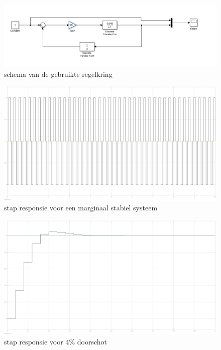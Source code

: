 \documentclass[a4paper, 12pt]{article}
\begin{document}
\begin{figure}[H]
	\includegraphics[width=1\linewidth]{Labo3_5_systeem.jpg}
	\caption{schema van de gebruikte regelkring}
\end{figure}

\begin{figure}[H]
	\includegraphics[width=1\linewidth]{Labo3_5_stapresponse.jpg}
	\caption{stap responsie voor een marginaal stabiel systeem}
\end{figure}

\begin{figure}[H]
	\includegraphics[width=1\linewidth]{Labo3_5_stapresponse2.jpg}
	\caption{stap responsie voor 4\% doorschot}
\end{figure}

\newpage
\end{document}
